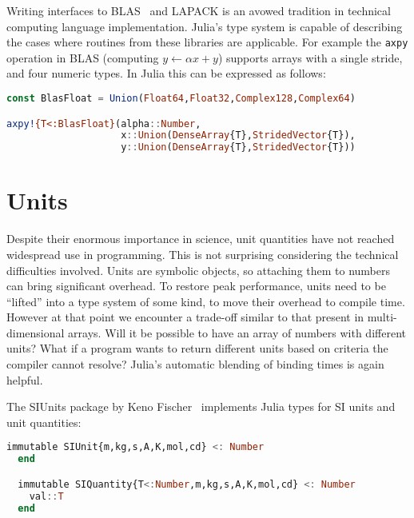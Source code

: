 Writing interfaces to BLAS~\cite{blas} and LAPACK is an avowed tradition
in technical computing language implementation.
Julia's type system is capable of describing the cases where routines
from these libraries are applicable.
For example the \texttt{axpy} operation in BLAS (computing $y\leftarrow \alpha x + y$)
supports arrays with a single stride, and four numeric types.
In Julia this can be expressed as follows:

\begin{singlespace}
\begin{lstlisting}[language=julia]
const BlasFloat = Union(Float64,Float32,Complex128,Complex64)

axpy!{T<:BlasFloat}(alpha::Number,
                    x::Union(DenseArray{T},StridedVector{T}),
                    y::Union(DenseArray{T},StridedVector{T}))
\end{lstlisting}
\end{singlespace}


\section{Units}

Despite their enormous importance in science, unit quantities have
not reached widespread use in programming.
This is not surprising considering the technical difficulties involved.
Units are symbolic objects, so attaching them to numbers can bring
significant overhead.
To restore peak performance, units need to be ``lifted'' into a type
system of some kind, to move their overhead to compile time.
However at that point we encounter a trade-off similar to that present
in multi-dimensional arrays.
Will it be possible to have an array of numbers with different units?
What if a program wants to return different units based on criteria
the compiler cannot resolve?
Julia's automatic blending of binding times is again helpful.

The SIUnits package by Keno Fischer~\cite{Fischer:2014si} implements
Julia types for SI units and unit quantities:

\begin{singlespace}
\begin{lstlisting}[language=julia]
  immutable SIUnit{m,kg,s,A,K,mol,cd} <: Number
  end

  immutable SIQuantity{T<:Number,m,kg,s,A,K,mol,cd} <: Number
    val::T
  end
\end{lstlisting}
\end{singlespace}

